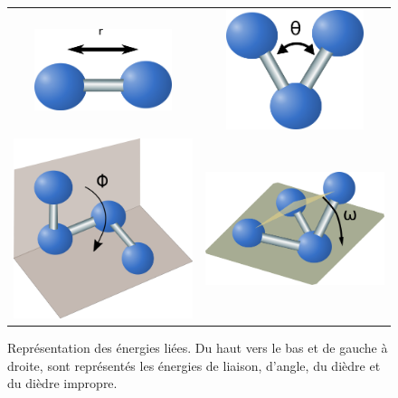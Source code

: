    \begin{figure}[!htbp]
     \centering
     \begin{tabular}{cc}
       \includegraphics[width=4cm]{figure/liaison.png} &
       \includegraphics[width=4cm]{figure/angle.png} \\
       \includegraphics[width=6cm]{figure/dihedre.png} &
       \includegraphics[width=6cm]{figure/impropre.png} \\

     \end{tabular}
     
     \caption{Représentation des énergies liées. Du haut vers le bas et de gauche à droite, sont représentés les énergies de liaison, d'angle, du dièdre et du dièdre impropre.}
\label{graph:E_liees}
   \end{figure}


